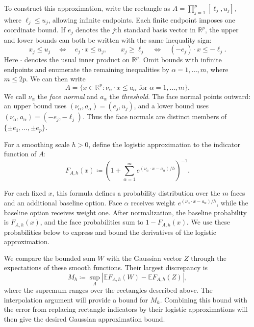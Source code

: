 \documentclass[11pt,letterpaper]{article}
\theoremstyle{remark}
\newcommand{\E}{\mathbb E}
\newcommand{\R}{\mathbb R}
\begin{document}
To construct this approximation, write the rectangle as
\(A=\prod_{j=1}^p[\ell_j,u_j]\), where \(\ell_j\le u_j\),
allowing infinite endpoints.
Each finite endpoint imposes one coordinate bound. If \(e_j\) denotes
the \(j\)th standard basis vector in \(\R^p\), the upper and lower
bounds can both be written with the same inequality sign:
\[
 x_j\le u_j
 \quad\Longleftrightarrow\quad e_j\cdot x\le u_j,
 \qquad
 x_j\ge\ell_j
 \quad\Longleftrightarrow\quad (-e_j)\cdot x\le-\ell_j.
\]
Here \(\cdot\) denotes the usual inner product on \(\R^p\).
Omit bounds with infinite endpoints and enumerate the remaining
inequalities by \(\alpha=1,\ldots,m\), where \(m\le2p\). We can
then write
\[
 A=\{x\in\R^p:\nu_\alpha\cdot x\le a_\alpha
                 \text{ for }\alpha=1,\ldots,m\}.
\]
We call \(\nu_\alpha\) the \emph{face normal} and \(a_\alpha\) the
\emph{threshold}. The face normal points outward: an upper bound uses
\((\nu_\alpha,a_\alpha)=(e_j,u_j)\), and a lower bound uses
\((\nu_\alpha,a_\alpha)=(-e_j,-\ell_j)\).
Thus the face normals are distinct members of
\(\{\pm e_1,\ldots,\pm e_p\}\).

For a smoothing scale \(h>0\), define the logistic approximation to
the indicator function of \(A\):
\begin{equation}
 F_{A,h}(x)\coloneqq \left(1+\sum_{\alpha=1}^m
          e^{(\nu_\alpha\cdot x-a_\alpha)/h}\right)^{-1}.
 \label{eq:selector}
\end{equation}

For each fixed \(x\), this formula defines a probability distribution
over the \(m\) faces and an additional baseline option. Face
\(\alpha\) receives weight \(e^{(\nu_\alpha\cdot x-a_\alpha)/h}\),
while the baseline option receives weight one. After normalization,
the baseline probability is \(F_{A,h}(x)\), and the face probabilities
sum to \(1-F_{A,h}(x)\). We use these probabilities below to express
and bound the derivatives of the logistic approximation.

We compare the bounded sum \(W\) with the Gaussian vector \(Z\)
through the expectations of these smooth functions. Their largest
discrepancy is
\begin{equation}
 M_h\coloneqq \sup_A\left|\E F_{A,h}(W)-\E F_{A,h}(Z)\right|,
 \label{eq:smoothed-discrepancy}
\end{equation}
where the supremum ranges over the rectangles described above.
The interpolation argument will provide a bound for \(M_h\).
Combining this bound with the error from replacing rectangle indicators
by their logistic approximations will then give the desired Gaussian
approximation bound.
\end{document}
